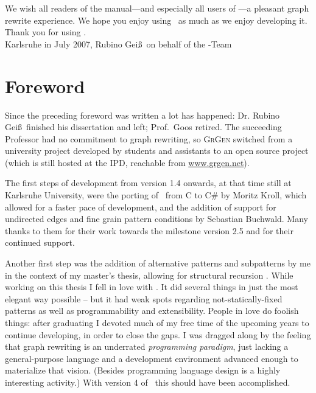 We wish all readers of the manual---and especially all users of \GrG---a pleasant graph rewrite experience.
We hope you enjoy using \GrG\ as much as we enjoy developing it.\\[3ex]

Thank you for using \GrG.\\[6ex]

\noindent Karlsruhe in July 2007, Rubino Gei\ss~on behalf of the \GrG-Team

\pagebreak


\chapter*{Foreword}

Since the preceding foreword was written a lot has happened: Dr. Rubino Gei\ss~finished his dissertation \cite{DissRuby} and left; Prof.\ Goos retired.
The succeeding Professor had no commitment to graph rewriting,
so \textsc{GrGen} switched from a university project developed by students and assistants
to an open source project (which is still hosted at the IPD, reachable from \url{www.grgen.net}).

The first steps of development from version 1.4 onwards, at that time still at Karlsruhe University, were the porting of \GrG\ from C to C\# \cite{Kro:07} by Moritz Kroll, which allowed for a faster pace of development,
and the addition of support for undirected edges and fine grain pattern conditions \cite{SABuchwald:2008} by Sebastian Buchwald.
Many thanks to them for their work towards the milestone version 2.5 \cite{ExpressiveConvenientFast:2010} and for their continued support. 

Another first step was the addition of alternative patterns and subpatterns by me in the context of my master's thesis, allowing for structural recursion \cite{Jak:08,StructuralRecursion}. 
While working on this thesis I fell in love with \GrG.
It did several things in just the most elegant way possible -- but it had weak spots regarding not-statically-fixed patterns as well as programmability and extensibility.
People in love do foolish things: after graduating I devoted much of my free time of the upcoming years to continue developing, in order to close the gaps.
I was dragged along by the feeling that graph rewriting is an underrated \emph{programming paradigm}, just lacking a general-purpose language and a development environment advanced enough to materialize that vision. (Besides programming language design is a highly interesting activity.)
With version 4 of \GrG\ this should have been accomplished.\\[2ex]

